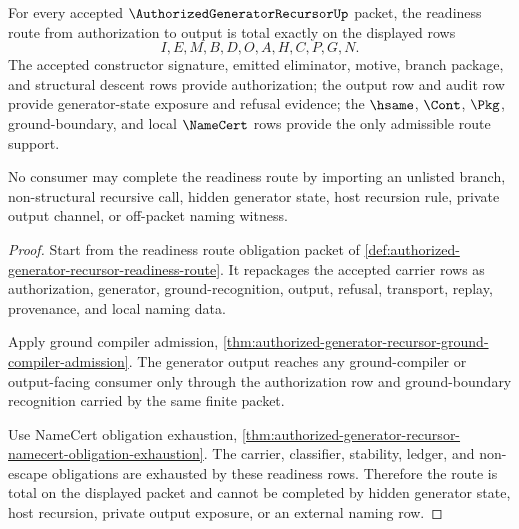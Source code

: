 \begin{theorem}
\label{thm:authorized-generator-recursor-readiness-route-totality}
For every accepted $\AuthorizedGeneratorRecursorUp$ packet, the readiness route
from authorization to output is total exactly on the displayed rows
$$
I,E,M,B,D,O,A,H,C,P,G,N.
$$
The accepted constructor signature, emitted eliminator, motive, branch
package, and structural descent rows provide authorization; the output row and
audit row provide generator-state exposure and refusal evidence; the
$\hsame$, $\Cont$, $\Pkg$, ground-boundary, and local $\NameCert$ rows provide
the only admissible route support.

No consumer may complete the readiness route by importing an unlisted branch,
non-structural recursive call, hidden generator state, host recursion rule,
private output channel, or off-packet naming witness.
\end{theorem}
\begin{proof}
Start from the readiness route obligation packet of
\autoref{def:authorized-generator-recursor-readiness-route}. It repackages the
accepted carrier rows as authorization, generator, ground-recognition, output,
refusal, transport, replay, provenance, and local naming data.

Apply ground compiler admission,
\autoref{thm:authorized-generator-recursor-ground-compiler-admission}. The
generator output reaches any ground-compiler or output-facing consumer only
through the authorization row and ground-boundary recognition carried by the
same finite packet.

Use NameCert obligation exhaustion,
\autoref{thm:authorized-generator-recursor-namecert-obligation-exhaustion}.
The carrier, classifier, stability, ledger, and non-escape obligations are
exhausted by these readiness rows. Therefore the route is total on the
displayed packet and cannot be completed by hidden generator state, host
recursion, private output exposure, or an external naming row.
\end{proof}

